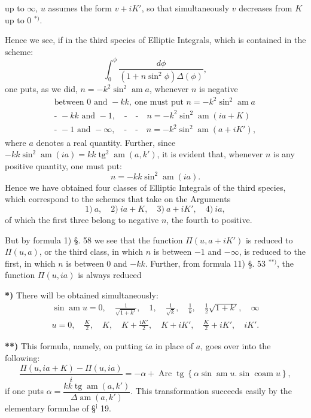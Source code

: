 \documentclass{article}
\begin{document}
up to $\infty$, $u$ assumes the form $v+iK'$, so that simultaneously $v$ decreases from $K$ up to 0 ${}^{*)}$.

Hence we see, if in the third species of Elliptic Integrals, which is contained in the scheme:
\[
\int_{0}^{\phi}\frac{d\phi}{(1+n\sin^{2}\phi)\Delta(\phi)},
\]
one puts, as we did, $n=-k^{2}\sin^{2}\operatorname{am}a$, whenever $n$ is negative
\[
\begin{gathered}
\text{between }0\text{ and }-kk,\ \text{one must put }n=-k^{2}\sin^{2}\operatorname{am}a\\[1ex]
\text{- }-kk\text{ and }-1,\quad\text{-}\quad\text{-}\quad n=-k^{2}\sin^{2}\operatorname{am}(ia+K)\\[1ex]
\text{- }-1\text{ and }-\infty,\quad\text{-}\quad\text{-}\quad n=-k^{2}\sin^{2}\operatorname{am}(a+iK'),
\end{gathered}
\]
where $a$ denotes a real quantity. Further, since $-kk\sin^{2}\operatorname{am}(ia)=kk\operatorname{tg}^{2}\operatorname{am}(a,k')$, it is evident that, whenever $n$ is any positive quantity, one must put:
\[
n=-kk\sin^{2}\operatorname{am}(ia).
\]
Hence we have obtained four classes of Elliptic Integrals of the third species, which correspond to the schemes that take on the Arguments
\[
\text{1)}\ a,\quad\text{2)}\ ia+K,\quad\text{3)}\ a+iK',\quad\text{4)}\ ia,
\]
of which the first three belong to negative $n$, the fourth to positive.

But by formula 1) §. 58 we see that the function $\Pi(u,a+iK')$ is reduced to $\Pi(u,a)$, or the third class, in which $n$ is between $-1$ and $-\infty$, is reduced to the first, in which $n$ is between 0 and $-kk$. Further, from formula 11) §. 53 ${}^{**)}$, the function $\Pi(u,ia)$ is always reduced

\textbf{*)} There will be obtained simultaneously:
\[
\begin{gathered}
\sin\operatorname{am}u=0,\quad\frac{1}{\sqrt{1+k'}},\quad 1,\quad\frac{1}{\sqrt{k}},\quad\frac{1}{k},\quad\frac{1}{2}\sqrt{1+k'},\quad\infty\\[1.5ex]
u=0,\quad\frac{K}{2},\quad K,\quad K+\frac{iK'}{2},\quad K+iK',\quad\frac{K}{2}+iK',\quad iK'.
\end{gathered}
\]

\textbf{**)} This formula, namely, on putting $ia$ in place of $a$, goes over into the following:
\[
\frac{\Pi(u,ia+K)-\Pi(u,ia)}{i}=-\alpha+\operatorname{Arc}\operatorname{tg}\left\{\alpha\sin\operatorname{am}u.\sin\operatorname{coam}u\right\},
\]
if one puts $\alpha=\dfrac{kk\operatorname{tg}\operatorname{am}(a,k')}{\Delta\operatorname{am}(a,k')}$. This transformation succeeds easily by the elementary formulae of §$^{\mathrm{i}}$ 19.
\end{document}
